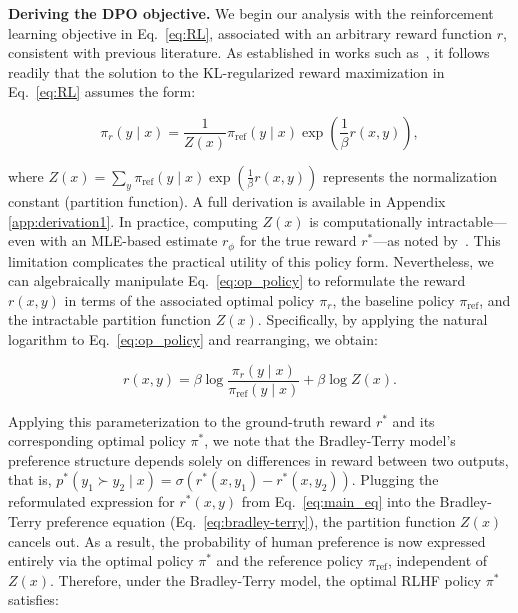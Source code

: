 \textbf{Deriving the DPO objective.} We begin our analysis with the reinforcement learning objective in Eq.~\ref{eq:RL}, associated with an arbitrary reward function $r$, consistent with previous literature. As established in works such as~\citep{peters2007reinforcement, peng2019advantage, korbak2022reinforcement, go2023aligning}, it follows readily that the solution to the KL-regularized reward maximization in Eq.~\ref{eq:RL} assumes the form:

\begin{equation}\label{eq:op_policy}
    \pi_r(y\mid x) = \frac{1}{Z(x)}\pi_\text{ref}(y\mid x)\exp\left(\frac{1}{\beta}r(x, y)\right),
\end{equation}

where $Z(x) =\sum_{y}\pi_\text{ref}(y\mid x)\exp\left(\frac{1}{\beta}r(x, y)\right)$ represents the normalization constant (partition function). A full derivation is available in Appendix \ref{app:derivation1}. In practice, computing $Z(x)$ is computationally intractable—even with an MLE-based estimate $r_\phi$ for the true reward $r^*$—as noted by~\citep{korbak2022reinforcement, go2023aligning}. This limitation complicates the practical utility of this policy form. Nevertheless, we can algebraically manipulate Eq.~\ref{eq:op_policy} to reformulate the reward $r(x, y)$ in terms of the associated optimal policy $\pi_r$, the baseline policy $\pi_\text{ref}$, and the intractable partition function $Z(x)$. Specifically, by applying the natural logarithm to Eq.~\ref{eq:op_policy} and rearranging, we obtain:

\begin{equation}\label{eq:main_eq}
    r(x,y) =\beta \log \frac{\pi_r(y\mid x)}{\pi_\text{ref}(y\mid x)} + \beta \log Z(x).
\end{equation}

Applying this parameterization to the ground-truth reward $r^*$ and its corresponding optimal policy $\pi^*$, we note that the Bradley-Terry model’s preference structure depends solely on differences in reward between two outputs, that is, ${p^*(y_1 \succ y_2 \mid x) = \sigma(r^*(x, y_1) - r^*(x, y_2))}$. Plugging the reformulated expression for $r^*(x, y)$ from Eq.~\ref{eq:main_eq} into the Bradley-Terry preference equation (Eq.~\ref{eq:bradley-terry}), the partition function $Z(x)$ cancels out. As a result, the probability of human preference is now expressed entirely via the optimal policy $\pi^*$ and the reference policy $\pi_\text{ref}$, independent of $Z(x)$. Therefore, under the Bradley-Terry model, the optimal RLHF policy $\pi^*$ satisfies:

